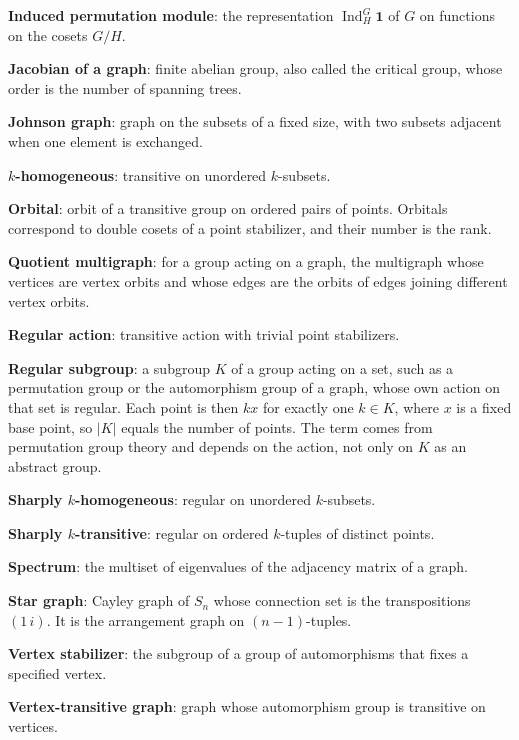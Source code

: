 \documentclass[12pt,letterpaper]{article}
\numberwithin{equation}{section}
\theoremstyle{definition}
\DeclareMathOperator{\Ind}{Ind}
\begin{document}
\noindent\textbf{Induced permutation module}: the representation $\Ind_H^G\mathbf1$ of $G$ on functions on the cosets $G/H$.\par
\noindent\textbf{Jacobian of a graph}: finite abelian group, also called the critical group, whose order is the number of spanning trees.\par
\noindent\textbf{Johnson graph}: graph on the subsets of a fixed size, with two subsets adjacent when one element is exchanged.\par
\noindent\textbf{$k$-homogeneous}: transitive on unordered $k$-subsets.\par
\noindent\textbf{Orbital}: orbit of a transitive group on ordered pairs of points. Orbitals correspond to double cosets of a point stabilizer, and their number is the rank.\par
\noindent\textbf{Quotient multigraph}: for a group acting on a graph, the multigraph whose vertices are vertex orbits and whose edges are the orbits of edges joining different vertex orbits.\par
\noindent\textbf{Regular action}: transitive action with trivial point stabilizers.\par
\noindent\textbf{Regular subgroup}: a subgroup $K$ of a group acting on a set, such as a permutation group or the automorphism group of a graph, whose own action on that set is regular. Each point is then $kx$ for exactly one $k\in K$, where $x$ is a fixed base point, so $|K|$ equals the number of points. The term comes from permutation group theory and depends on the action, not only on $K$ as an abstract group.\par
\noindent\textbf{Sharply $k$-homogeneous}: regular on unordered $k$-subsets.\par
\noindent\textbf{Sharply $k$-transitive}: regular on ordered $k$-tuples of distinct points.\par
\noindent\textbf{Spectrum}: the multiset of eigenvalues of the adjacency matrix of a graph.\par
\noindent\textbf{Star graph}: Cayley graph of $S_n$ whose connection set is the transpositions $(1\,i)$. It is the arrangement graph on $(n-1)$-tuples.\par
\noindent\textbf{Vertex stabilizer}: the subgroup of a group of automorphisms that fixes a specified vertex.\par
\noindent\textbf{Vertex-transitive graph}: graph whose automorphism group is transitive on vertices.\par
\end{document}
